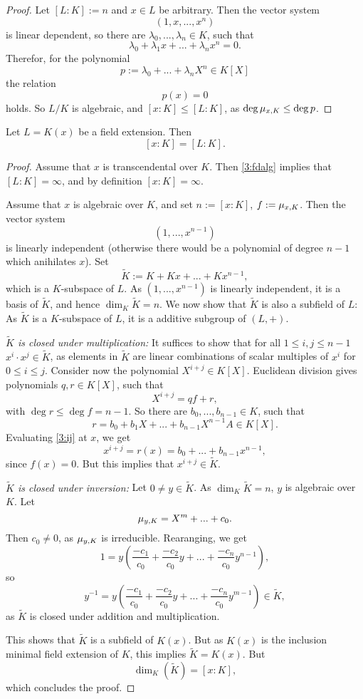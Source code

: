 \begin{proof}
  Let $[L:K]:= n$ and $x\in L$ be arbitrary. Then the vector system
  \[
  (1,x,...,x^n)
  \]
  is linear dependent, so there are $\lambda_0,...,\lambda_n\in K$, such that
  \[\lambda_0+\lambda_1x+...+\lambda_nx^n=0.\]
  Therefor, for the polynomial
  \[ p:= \lambda_0+...+\lambda_nX^n\in K[X]\]
  the relation
  \[
  p(x)=0\]
  holds. So $L/K$ is algebraic, and $[x:K]\leq [L:K]$, as $\deg \mu_{x,K}\leq \deg p$.
\end{proof}
\begin{thm}\label{3:algfield}
  Let $L=K(x)$ be a field extension. Then
  \[
  [x:K]=[L:K].
  \]
\end{thm}
\begin{proof}
  Assume that $x$ is transcendental over $K$. Then \cref{3:fdalg} implies that $[L:K]=\infty$, and by definition $[x:K]=\infty$.\par
  Assume that $x$ is algebraic over $K$, and set $n:=[x:K]$, $f:=\mu_{x,K}$. Then the vector system
  \[
  (1,...,x^{n-1})
  \]
  is linearly independent (otherwise there would be a polynomial of degree $n-1$ which anihilates $x$). Set
  \[
  \tilde{K}:= K+Kx+...+Kx^{n-1},
  \]
  which is a $K$-subspace of $L$. As $(1,...,x^{n-1})$ is linearly independent, it is a basis of $\tilde{K}$, and hence $\dim_K\tilde{K}=n$. We now show that $\tilde{K}$ is also a subfield of $L$:
    As $\tilde{K}$ is a $K$-subspace of $L$, it is a additive subgroup of $(L,+)$.\par
    \textit{$\tilde{K}$ is closed under multiplication: } It suffices to show that for all $1\leq i,j\leq n-1$ $x^i\cdot x^j\in \tilde{K}$, as elements in $\tilde{K}$ are linear combinations of scalar multiples of $x^i$  for $0\leq i\leq j$. Consider now the polynomial $X^{i+j}\in K[X]$. Euclidean division gives polynomials $q,r\in K[X]$, such that
    \begin{equation}\label{3:ij}\tag{$\ast$}
    X^{i+j}=qf+r,
    \end{equation}
    with $\deg r \leq \deg f =n-1$. So there are $b_0,...,b_{n-1}\in K$, such that
    \[
    r=b_0+b_1X+...+b_{n-1}X^{n-1}A\in K[X].
    \]
    Evaluating \eqref{3:ij} at $x$, we get
    \[
    x^{i+j}=r(x)=b_0+...+b_{n-1}x^{n-1},
    \] since $f(x)=0$. But this implies that $x^{i+j}\in \tilde{K}$.\par
    \textit{$\tilde{K}$ is closed under inversion: }Let $0\neq y\in \tilde{K}$. As $\dim_K\tilde{K}=n$, $y$ is algebraic over $K$. Let
    \[
    \mu_{y,K}=X^{m}+...+c_0.
    \]
    Then $c_0\neq 0$, as $\mu_{y,K}$ is irreducible. Rearanging, we get
    \[
    1 = y\left(\frac{-c_1}{c_0}+\frac{-c_2}{c_0}y+...+\frac{-c_n}{c_0}y^{n-1}\right),
    \]
    so
    \[
    y^{-1}=
    y\left(\frac{-c_1}{c_0}+\frac{-c_2}{c_0}y+...+\frac{-c_n}{c_0}y^{m-1}\right)\in \tilde{K},
    \]
    as $\tilde{K}$ is closed under addition and multiplication.\par
    This shows that $\tilde{K}$ is a subfield of $K(x)$. But as $K(x)$ is the inclusion minimal field extension of $K$, this implies $\tilde{K}=K(x)$. But
    \[
    \dim_K(\tilde{K}) = [x:K],
    \]
    which concludes the proof.
\end{proof}

